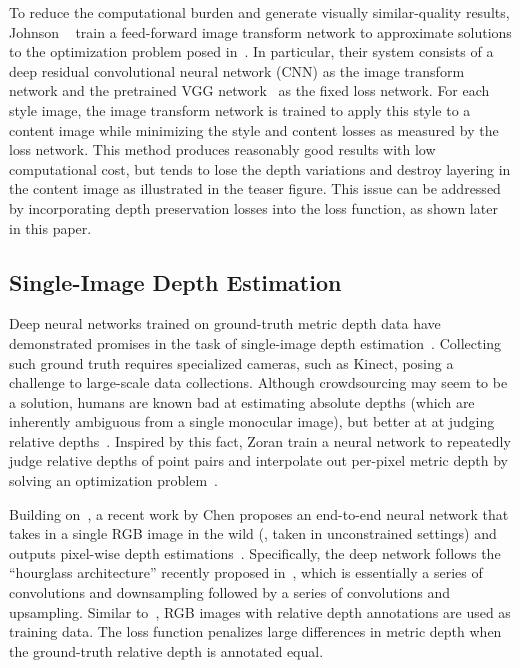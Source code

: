 \documentclass[10pt,twocolumn,letterpaper]{article}
\begin{document}
To reduce the computational burden and generate visually similar-quality results, Johnson \etal~\cite{johnson2016perceptual} train a feed-forward image transform network to approximate solutions to the optimization problem posed in~\cite{gatys2016image}. In particular, their system consists of a deep residual convolutional neural network (CNN) as the image transform network and the pretrained VGG network~\cite{simonyan2014very} as the fixed loss network. For each style image, the image transform network is trained to apply this style to a content image while minimizing the style and content losses as measured by the loss network. This method produces reasonably good results with low computational cost, but tends to lose the depth variations and destroy layering in the content image as illustrated in the teaser figure. This issue can be addressed by incorporating depth preservation losses into the loss function, as shown later in this paper.

\subsection{Single-Image Depth Estimation}

Deep neural networks trained on ground-truth metric depth data have demonstrated promises in the task of single-image depth estimation~\cite{liu2015deep,eigen2015predicting,li2015depth,wang2015towards}. Collecting such ground truth requires specialized cameras, such as Kinect, posing a challenge to large-scale data collections. Although crowdsourcing may seem to be a solution, humans are known bad at estimating absolute depths (which are inherently ambiguous from a single monocular image), but better at at judging relative depths~\cite{todd2003visual}. Inspired by this fact, Zoran \etal train a neural network to repeatedly judge relative depths of point pairs and interpolate out per-pixel metric depth by solving an optimization problem~\cite{zoran2015learning}.

Building on~\cite{zoran2015learning}, a recent work by Chen \etal proposes an end-to-end neural network that takes in a single RGB image in the wild (\ie, taken in unconstrained settings) and outputs pixel-wise depth estimations~\cite{chen2016single}. Specifically, the deep network follows the ``hourglass architecture'' recently proposed in~\cite{newell2016stacked}, which is essentially a series of convolutions and downsampling followed by a series of convolutions and upsampling. Similar to~\cite{zoran2015learning}, RGB images with relative depth annotations are used as training data. The loss function penalizes large differences in metric depth when the ground-truth relative depth is annotated equal.
\end{document}
